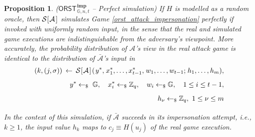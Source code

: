 \documentclass[10pt, psamsfonts, reqno]{amsart}
\newtheorem{prop}[thm]{Proposition}
\theoremstyle{definition}
\theoremstyle{remark}
\numberwithin{equation}{section}
\begin{document}
\begin{prop}\label{orst_simulated_impersonation_attack_prop}
\textup{($\mathsf{ORST}
	_{\hspace{1pt}\mathbb{G}, n, t}
	^{\hspace{1pt}\mathbf{imp}}
$
-- \textit{Perfect simulation})}
If $H$ is modelled as a random oracle, then
$
\mathcal{S}
		\hspace{.5pt}
		[
			\hspace{0.5pt}
			\mathcal{A}
			\hspace{1pt}
		]
$
simulates Game \textup{\ref{orst_attack_impersonation}} perfectly
if invoked with uniformly random input,
in the sense that the real and simulated game executions
are indistinguishable from the adversary's viewpoint.
More accurately, the probability distribution of $\mathcal{A}$'s view
in the real attack game
is identical to the distribution of $\mathcal{\bar{A}}$'s
input in
\vspace{6pt}
\begin{equation}\label{orst_attack_simulated}
\begin{split}
(k, (j, \sigma)) \hspace{2pt}\leftarrow\hspace{2pt} \mathcal{S}
		\hspace{.5pt}
		[
			\hspace{0.5pt}
			\mathcal{A}
			\hspace{1pt}
		]
		\hspace{1pt}
		(
			\hspace{1pt}
			y ^*,
			\hspace{1pt}
			x_1^*, \dots, x_{t-1}^*,
			\hspace{1pt}
			w_1, \dots, w_{t-1};
			\hspace{1pt}
			h_1, \dots, h_m
		),\\[5pt]
y^* \leftarrow_\$ \hspace{3pt}\mathbb{G},
\ \ \ x_i^* \leftarrow_\$ \mathbb{Z}_q,
\ \ \ w_i \leftarrow_\$ \mathbb{G},
\ \ \ 1 \le i \le t - 1,\\[5pt]
h_\nu \leftarrow_\$ \mathbb{Z}_q,\ 1 \le \nu \le m\\[6pt]
\end{split}
\end{equation}
In the context of this simulation, if $\mathcal{\bar{A}}$
succeeds in its impersonation attempt,
i.e., $k \ge 1$, the input value $h_k$ maps
to $c_j \equiv H(u_j)$ of the real game execution.
\end{prop}
\end{document}
